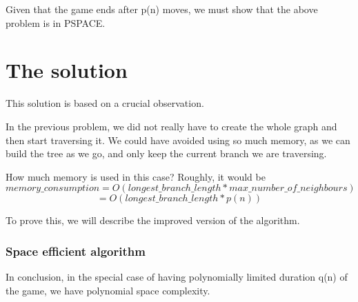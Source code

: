 Given that the game ends after p(n) moves, we must show that the above problem
is in PSPACE.

\section*{The solution}

This solution is based on a crucial observation. 

In the previous problem, we did not really have to create the whole
graph and then start traversing it. We could have avoided using so much memory,
as we can build the tree as we go, and only keep the current branch we are
traversing. 

How much memory is used in this case? Roughly, it would be \[ memory\_consumption =O(longest\_branch\_length * max\_number\_of\_neighbours) \] \[=O(longest\_ branch\_length*p(n))\] 

To prove this, we will describe the improved version of the algorithm.

\subsubsection*{Space efficient algorithm}

In conclusion, in the special case of having polynomially limited duration q(n) of the game, we have polynomial space 
complexity.

